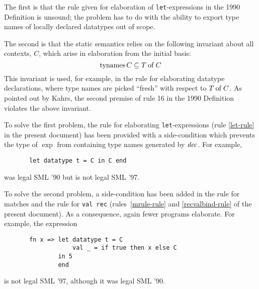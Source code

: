 The first is that the rule given for elaboration of 
{\tt let}-expressions in the 1990 Definition
is unsound\cite{kahrs93}; the problem has to do with the ability to export
type names of locally declared datatypes out of scope.

The second is that the static semantics relies on the following invariant 
about all contexts, $C$, which arise in elaboration from the
initial basis:
\[
\mathop{\rm tynames}\nolimits C\subseteq T \mathbin{\rm of} C
\]
This invariant is used, for example, in the rule for elaborating
datatype declarations, where type names are picked ``fresh'' with
respect to $T \mathbin{\rm of} C$. As pointed out by Kahrs, the second premise
of rule 16 in the 1990 Definition violates the above invariant.

To solve the first problem,
the rule for elaborating {\tt let}-expressions (rule \ref{let-rule} in the present
document) has been 
provided with a side-condition which prevents the type of $\exp$ from
containing  type names generated 
by ${\it dec}$. For example, 
\begin{verbatim}
       let datatype t = C in C end
\end{verbatim}
was legal SML '90 but is not legal SML '97.

To solve the second problem, a side-condition has been added in the rule 
for matches and the rule for {\tt val rec} (rules~\ref{mrule-rule} 
and \ref{recvalbind-rule} of the present document).
As a consequence, again fewer programs elaborate.
For example, the expression
\begin{verbatim}
       fn x => let datatype t = C
                   val _ = if true then x else C
               in 5 
               end
\end{verbatim}
is not legal SML '97, although it was legal SML '90.

% 


